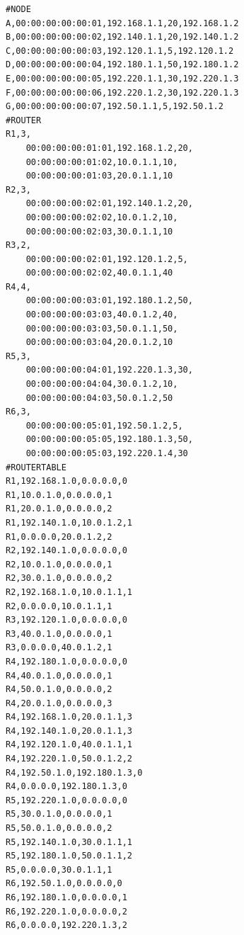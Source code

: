 \documentclass[12pt]{article}
\begin{document}
\begin{lstlisting}[breaklines=true]
#NODE
A,00:00:00:00:00:01,192.168.1.1,20,192.168.1.2
B,00:00:00:00:00:02,192.140.1.1,20,192.140.1.2
C,00:00:00:00:00:03,192.120.1.1,5,192.120.1.2
D,00:00:00:00:00:04,192.180.1.1,50,192.180.1.2
E,00:00:00:00:00:05,192.220.1.1,30,192.220.1.3
F,00:00:00:00:00:06,192.220.1.2,30,192.220.1.3
G,00:00:00:00:00:07,192.50.1.1,5,192.50.1.2
#ROUTER
R1,3,
	00:00:00:00:01:01,192.168.1.2,20,
    00:00:00:00:01:02,10.0.1.1,10,
    00:00:00:00:01:03,20.0.1.1,10
R2,3,
	00:00:00:00:02:01,192.140.1.2,20,
    00:00:00:00:02:02,10.0.1.2,10,
    00:00:00:00:02:03,30.0.1.1,10
R3,2,
	00:00:00:00:02:01,192.120.1.2,5,
    00:00:00:00:02:02,40.0.1.1,40
R4,4,
	00:00:00:00:03:01,192.180.1.2,50,
    00:00:00:00:03:03,40.0.1.2,40,
    00:00:00:00:03:03,50.0.1.1,50,
    00:00:00:00:03:04,20.0.1.2,10
R5,3,
	00:00:00:00:04:01,192.220.1.3,30,
    00:00:00:00:04:04,30.0.1.2,10,
    00:00:00:00:04:03,50.0.1.2,50
R6,3,
	00:00:00:00:05:01,192.50.1.2,5,
    00:00:00:00:05:05,192.180.1.3,50,
    00:00:00:00:05:03,192.220.1.4,30
#ROUTERTABLE
R1,192.168.1.0,0.0.0.0,0
R1,10.0.1.0,0.0.0.0,1
R1,20.0.1.0,0.0.0.0,2
R1,192.140.1.0,10.0.1.2,1
R1,0.0.0.0,20.0.1.2,2
R2,192.140.1.0,0.0.0.0,0
R2,10.0.1.0,0.0.0.0,1
R2,30.0.1.0,0.0.0.0,2
R2,192.168.1.0,10.0.1.1,1
R2,0.0.0.0,10.0.1.1,1
R3,192.120.1.0,0.0.0.0,0
R3,40.0.1.0,0.0.0.0,1
R3,0.0.0.0,40.0.1.2,1
R4,192.180.1.0,0.0.0.0,0
R4,40.0.1.0,0.0.0.0,1
R4,50.0.1.0,0.0.0.0,2
R4,20.0.1.0,0.0.0.0,3
R4,192.168.1.0,20.0.1.1,3
R4,192.140.1.0,20.0.1.1,3
R4,192.120.1.0,40.0.1.1,1
R4,192.220.1.0,50.0.1.2,2
R4,192.50.1.0,192.180.1.3,0
R4,0.0.0.0,192.180.1.3,0
R5,192.220.1.0,0.0.0.0,0
R5,30.0.1.0,0.0.0.0,1
R5,50.0.1.0,0.0.0.0,2
R5,192.140.1.0,30.0.1.1,1
R5,192.180.1.0,50.0.1.1,2
R5,0.0.0.0,30.0.1.1,1
R6,192.50.1.0,0.0.0.0,0
R6,192.180.1.0,0.0.0.0,1
R6,192.220.1.0,0.0.0.0,2
R6,0.0.0.0,192.220.1.3,2
\end{lstlisting}

% 
% 
\end{document}
